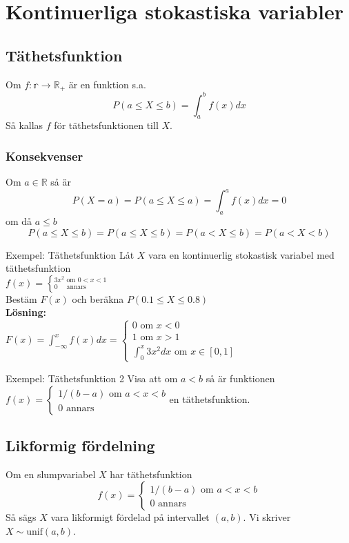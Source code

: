 \chapter{Kontinuerliga stokastiska variabler}
\section{Täthetsfunktion}
Om $f:\mathbb{r}\rightarrow\mathbb{R}_+$ är en funktion s.a.
$$
	P(a\leq X \leq b)=\int_a^bf(x)dx
$$
Så kallas $f$ för täthetsfunktionen till $X$.
\subsection{Konsekvenser}
Om $a\in\mathbb{R}$ så är $$
	P(X=a)=P(a\leq X\leq a)=\int_a^af(x)dx=0
$$
om då $a\leq b$
$$
	P(a\leq X\leq b)=P(a\leq X\leq b) =P(a<X\leq b)=P(a<X<b)
$$
\begin{exempel}{Exempel: Täthetsfunktion}
	Låt $X$ vara en kontinuerlig stokastisk variabel med täthetsfunktion\\
	$f(x)=\left\lbrace^{3x^2\text{ om }0<x<1}_{0\text{ ~ ~annars}}\right.$\\
	Bestäm $F(x)$ och beräkna $P(0.1\leq X\leq 0.8)$\\
	\textbf{Lösning:}\\
	$F(x)=\int_{-\infty}^xf(x)dx=\begin{cases}
			0 \text{ om }x<0 \\
			1\text{ om }x>1  \\
			\int_0^x3x^2dx\text{ om }x\in [0,1]
		\end{cases}$
\end{exempel}
\begin{exempel}{Exempel: Täthetsfunktion 2}
	Visa att om $a<b$ så är funktionen $
		f(x)=\begin{cases}
			1/(b-a)\text{ om }a<x<b \\
			0\text{ annars}
		\end{cases}
	$en täthetsfunktion.
\end{exempel}
\section{Likformig fördelning}
Om en slumpvariabel $X$ har täthetsfunktion $$
	f(x)=\begin{cases}
		1/(b-a)\text{ om }a<x<b \\
		0\text{ annars}
	\end{cases}
$$
Så sägs $X$ vara likformigt fördelad på intervallet $(a,b)$. Vi skriver $X\sim \text{unif}(a,b)$.
